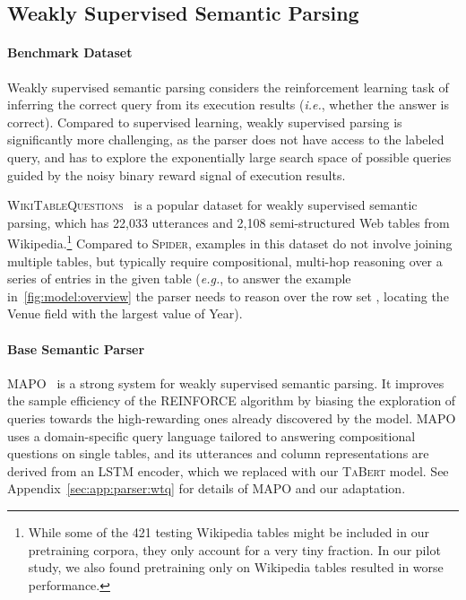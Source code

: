 \documentclass[11pt,a4paper]{article}
\def\model/{\textsc{TaBert}}
\renewcommand{\tt}[1]{\fontfamily{cmtt}\selectfont #1}
\newcommand{\eg}{\hbox{\emph{e.g.}}\xspace}
\newcommand{\ie}{\hbox{\emph{i.e.}}\xspace}
\def\wtq/{\textsc{WikiTableQuestions}}
\def\spider/{\textsc{Spider}}
\begin{document}
\subsection{Weakly Supervised Semantic Parsing}
\label{sec:exp:parser:wtq}

\paragraph{Benchmark Dataset}
Weakly supervised semantic parsing considers the reinforcement learning task of inferring the correct query from its execution results (\ie, whether the answer is correct).
Compared to supervised learning, weakly supervised parsing is significantly more challenging, as the parser does not have access to the labeled query, and has to explore the exponentially large search space of possible queries guided by the noisy binary reward signal of execution results.


\wtq/~\cite{pasupat2015compositional} is a popular dataset for weakly supervised semantic parsing, which has 22,033 utterances and 2,108 semi-structured Web tables from Wikipedia.\footnote{While some of the 421 testing Wikipedia tables might be included in our pretraining corpora, they only account for a very tiny fraction. In our pilot study, we also found pretraining only on Wikipedia tables resulted in worse performance.}
Compared to \spider/, examples in this dataset do not involve joining multiple tables, but typically require compositional, multi-hop reasoning over a series of entries in the given table (\eg, to answer the example in~\autoref{fig:model:overview} the parser needs to reason over the row set , locating the {\tt Venue} field with the largest value of {\tt Year}).


\paragraph{Base Semantic Parser} MAPO~\cite{liang18mapo} is a strong system for weakly supervised semantic parsing.  
It improves the sample efficiency of the REINFORCE algorithm by biasing the exploration of queries towards the high-rewarding ones already discovered by the model.
MAPO uses a domain-specific query language tailored to answering compositional questions on single tables, and its utterances and column representations are derived from an LSTM encoder,
which we replaced with our \model/ model.
See Appendix~\autoref{sec:app:parser:wtq} for details of MAPO and our adaptation.
\end{document}

